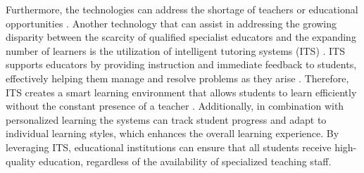 \documentclass[]{lni}
\begin{document}
Furthermore, the technologies can address the shortage of teachers or educational opportunities \cite{cai2021review} \cite{Blanchard2015}.  
%
Another technology that can assist in addressing the growing disparity between the scarcity of qualified specialist educators and the expanding number of learners 
is the utilization of intelligent tutoring systems (ITS) \cite{9670009}. ITS supports educators by providing instruction and immediate feedback to students, effectively 
helping them manage and resolve problems as they arise \cite{9582029}. Therefore, ITS creates a smart learning environment that allows students to learn 
efficiently without the constant presence of a teacher \cite{9582029}. Additionally, in combination with personalized learning the  systems can track student 
progress and adapt to individual learning styles, which enhances the overall learning experience. By leveraging ITS, educational institutions can ensure that all 
students receive high-quality education, regardless of the availability of specialized teaching staff.
%
%
%
%
\end{document}
